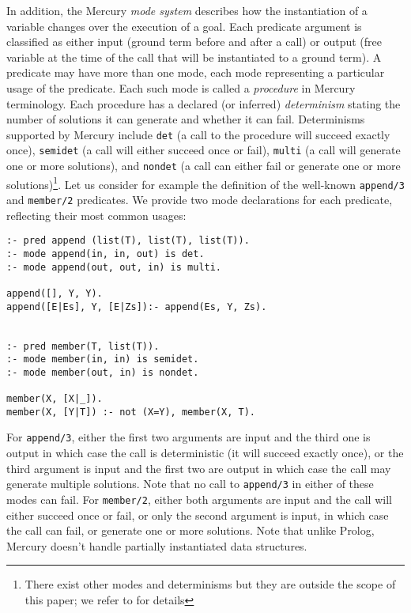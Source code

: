 \documentclass[british]{llncs}
\begin{document}
In addition, the Mercury \emph{mode system} describes how the instantiation
of a variable changes over the execution of a goal. Each predicate
argument is classified as either input (ground term before and after
a call) or output (free variable at the time of the call that will
be instantiated to a ground term). A predicate may have more than
one mode, each mode representing a particular usage of the predicate.
Each such mode is called a \emph{procedure} in Mercury terminology.
Each procedure has a declared (or inferred) \emph{determinism} stating
the number of solutions it can generate and whether it can fail. Determinisms
supported by Mercury include \texttt{det} (a call to the procedure
will succeed exactly once), \texttt{semidet} (a call will either succeed
once or fail), \texttt{multi} (a call will generate one or more solutions),
and \texttt{nondet} (a call can either fail or generate one or more
solutions)\footnote{There exist other modes and determinisms but they are outside the
scope of this paper; we refer to \cite{mercury:jlp} for details}. Let us consider for example the definition of the well-known \texttt{append/3}
and \texttt{member/2} predicates. We provide two mode declarations
for each predicate, reflecting their most common usages:


\begin{lstlisting}[basicstyle={\small\ttfamily},breaklines=true,tabsize=4]
:- pred append (list(T), list(T), list(T)).
:- mode append(in, in, out) is det.
:- mode append(out, out, in) is multi.

append([], Y, Y).
append([E|Es], Y, [E|Zs]):- append(Es, Y, Zs).


:- pred member(T, list(T)).
:- mode member(in, in) is semidet.
:- mode member(out, in) is nondet.

member(X, [X|_]).
member(X, [Y|T]) :- not (X=Y), member(X, T).
\end{lstlisting}


For \texttt{append/3}, either the first two arguments are input and
the third one is output in which case the call is deterministic (it
will succeed exactly once), or the third argument is input and the
first two are output in which case the call may generate multiple
solutions. Note that no call to \texttt{append/3} in either of these
modes can fail. For \texttt{member/2}, either both arguments are input
and the call will either succeed once or fail, or only the second
argument is input, in which case the call can fail, or generate one
or more solutions. Note that unlike Prolog, Mercury doesn't handle partially instantiated data structures.
\end{document}
